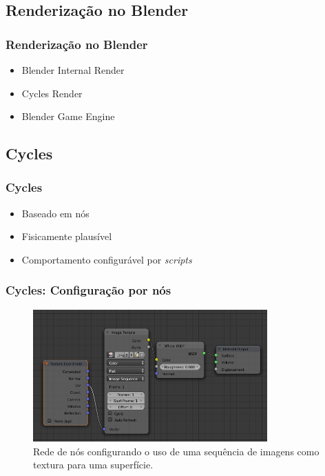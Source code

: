 \documentclass{beamer}
\begin{document}
\subsection{Renderização no Blender}

\begin{frame}

\frametitle{Renderização no Blender}
\begin{itemize}
\item Blender Internal Render

\item Cycles Render

\item Blender Game Engine
\end{itemize}


\end{frame}

\subsection{Cycles}
\begin{frame}

\frametitle{Cycles}
\begin{itemize}
\item Baseado em nós

\item Fisicamente plausível

\item Comportamento configurável por {\it scripts}
\end{itemize}


\end{frame}


\begin{frame}

\frametitle{Cycles: Configuração por nós}

\begin{figure}[!htb]
\center
\includegraphics[width=9cm]{Cycles_nodes}
\caption{Rede de nós configurando o uso de uma sequência de imagens como textura para uma superfície.}
\end{figure}

\end{frame}
\end{document}
